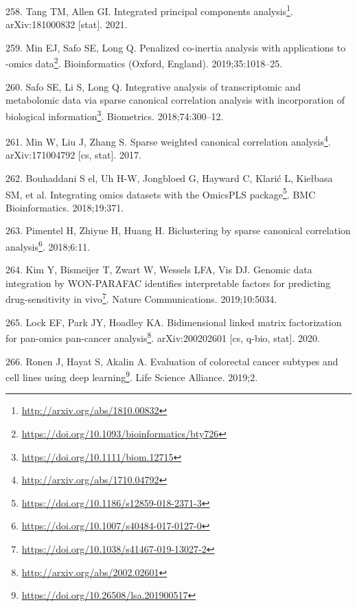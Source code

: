 \documentclass[
  a4paper,
]{book}
\DeclareRobustCommand{\href}[2]{#2\footnote{\url{#1}}}
\newlength{\cslhangindent}
\newlength{\cslentryspacingunit} %
\newenvironment{CSLReferences}[2] %
 {%
  \setlength{\parindent}{0pt}
  \ifodd #1
  \let\oldpar\par
  \def\par{\hangindent=\cslhangindent\oldpar}
  \fi
  \setlength{\parskip}{#2\cslentryspacingunit}
 }%
 {}
\begin{document}
\begin{CSLReferences}{0}{0}
\leavevmode{}%
258. Tang TM, Allen GI. \href{http://arxiv.org/abs/1810.00832}{Integrated principal components analysis}. arXiv:181000832 {[}stat{]}. 2021.

\leavevmode{}%
259. Min EJ, Safo SE, Long Q. \href{https://doi.org/10.1093/bioinformatics/bty726}{Penalized co-inertia analysis with applications to -omics data}. Bioinformatics (Oxford, England). 2019;35:1018--25.

\leavevmode{}%
260. Safo SE, Li S, Long Q. \href{https://doi.org/10.1111/biom.12715}{Integrative analysis of transcriptomic and metabolomic data via sparse canonical correlation analysis with incorporation of biological information}. Biometrics. 2018;74:300--12.

\leavevmode{}%
261. Min W, Liu J, Zhang S. \href{http://arxiv.org/abs/1710.04792}{Sparse weighted canonical correlation analysis}. arXiv:171004792 {[}cs, stat{]}. 2017.

\leavevmode{}%
262. Bouhaddani S el, Uh H-W, Jongbloed G, Hayward C, Klarić L, Kiełbasa SM, et al. \href{https://doi.org/10.1186/s12859-018-2371-3}{Integrating omics datasets with the OmicsPLS package}. BMC Bioinformatics. 2018;19:371.

\leavevmode{}%
263. Pimentel H, Zhiyue H, Huang H. \href{https://doi.org/10.1007/s40484-017-0127-0}{Biclustering by sparse canonical correlation analysis}. 2018;6:11.

\leavevmode{}%
264. Kim Y, Bismeijer T, Zwart W, Wessels LFA, Vis DJ. \href{https://doi.org/10.1038/s41467-019-13027-2}{Genomic data integration by WON-PARAFAC identifies interpretable factors for predicting drug-sensitivity in vivo}. Nature Communications. 2019;10:5034.

\leavevmode{}%
265. Lock EF, Park JY, Hoadley KA. \href{http://arxiv.org/abs/2002.02601}{Bidimensional linked matrix factorization for pan-omics pan-cancer analysis}. arXiv:200202601 {[}cs, q-bio, stat{]}. 2020.

\leavevmode{}%
266. Ronen J, Hayat S, Akalin A. \href{https://doi.org/10.26508/lsa.201900517}{Evaluation of colorectal cancer subtypes and cell lines using deep learning}. Life Science Alliance. 2019;2.


\end{CSLReferences}
\end{document}
